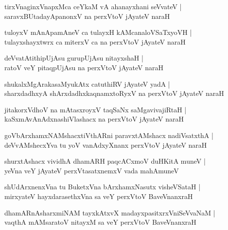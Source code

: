 \begin{shloka}
tirxVnaginxVnapxMca ceYkaM vA ahanayxhani seVvateV |\\
saravxBUtadayApanonxV na perxVtoV jAyateV naraH 
\end{shloka}

\begin{shloka}
tuloyxV mAnApamAneV ca tulayxH kAMcanaloVSaTxyoVH |\\
tulayxshayxtwrx ca miterxV ca na perxVtoV jAyateV naraH 
\end{shloka}

\begin{shloka}
deVvatAtithipUjAsu gurupUjAsu nitayxshaH |\\
ratoV veY pitaqpUjAsu na perxVtoV jAyateV naraH 
\end{shloka}

\begin{shloka}
shukalxMgArakasaMyukAtx catuthiRV jAyateV yadA |\\
sharxdadhxyA shArxdadhxkaqnamxtoRyxV na perxVtoV jAyateV naraH 
\end{shloka}

\begin{shloka}
jitakorxVdhoV na mAtasxroyxV taqSaNx saMgavivajiRtaH |\\
kaSxmAvAnAdxnashiVlashacx na perxVtoV jAyateV naraH
\end{shloka}

\begin{shloka}
goVbArxhamxNAMshacxtiVthARni paravxtAMshacx nadiVsatxthA |\\
deVvAMshecxYva tu yoV vanAdxyXnanx perxVtoV jAyateV naraH 
\end{shloka}

\begin{shloka}
shurxtAshacx vividhA dhamARH paqcACxmoV duHKitA muneV |\\
yeVna veY jAyateV perxVtasatxnemxV vada mahAmuneV 
\end{shloka}

\begin{shloka}
shUdArxnenxVna tu BuketxVna bArxhamxNasutx visheVSataH |\\
mirxyateV hayxdarasethxVna sa veY perxVtoV BaveVnanxraH
\end{shloka}

\begin{shloka}
dhamARnAsharxmiNAM tayxkAtxvX madayxpasitxrxVniSeVvaNaM |\\
vaqthA mAMsaratoV nitayxM sa veY perxVtoV BaveVnanxraH 
\end{shloka}

